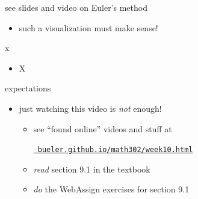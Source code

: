 \documentclass[urlcolor=blue,dvipsnames]{beamer}
\begin{document}
\begin{frame}{see slides and video on Euler's method}
\begin{itemize}
    \begin{itemize}
    \item such a visualization must make sense!
    \end{itemize}
\end{itemize}
\end{frame}


\begin{frame}{x}

\begin{itemize}
\item X
\end{itemize}
\end{frame}




\begin{frame}{expectations}

\begin{itemize}
\item just watching this video is \emph{not} enough!
     \begin{itemize}
     \item see ``found online'' videos and stuff at

     \centerline{\href{https://bueler.github.io/math302/week10.html}{\tt \color{cyan} bueler.github.io/math302/week10.html}}
     \item \emph{read} section 9.1 in the textbook
     \item \emph{do} the WebAssign exercises for section 9.1
     \end{itemize}
\end{itemize}
\end{frame}
\end{document}
